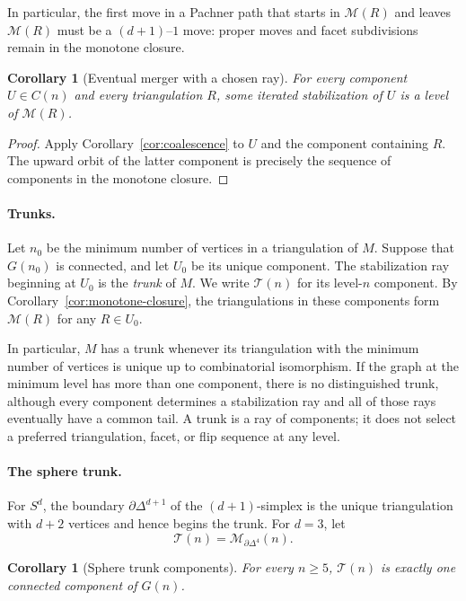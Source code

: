 \documentclass[11pt]{article}
\newtheorem{corollary}[theorem]{Corollary}
\theoremstyle{remark}
\theoremstyle{plain}
\begin{document}
In particular, the first move in a Pachner path that starts in
\(\mathcal M(R)\) and leaves \(\mathcal M(R)\) must be a
\((d+1)\)--\(1\) move: proper moves and facet subdivisions remain in the
monotone closure.

\begin{corollary}[Eventual merger with a chosen ray]
\label{cor:absorption}
For every component \(U\in C(n)\) and every triangulation \(R\), some
iterated stabilization of \(U\) is a level of \(\mathcal M(R)\).
\end{corollary}

\begin{proof}
Apply Corollary~\ref{cor:coalescence} to \(U\) and the component containing
\(R\).  The upward orbit of the latter component is precisely the sequence of
components in the monotone closure.
\end{proof}

\paragraph{Trunks.}
Let \(n_0\) be the minimum number of vertices in a triangulation of \(M\).
Suppose that \(G(n_0)\) is connected, and let \(U_0\) be its unique
component.  The stabilization ray beginning at \(U_0\) is the \emph{trunk}
of \(M\).  We write \(\mathcal T(n)\) for its level-\(n\) component.  By
Corollary~\ref{cor:monotone-closure}, the triangulations in these components
form \(\mathcal M(R)\) for any \(R\in U_0\).

In particular, \(M\) has a trunk whenever its triangulation with the minimum
number of vertices is unique up to combinatorial isomorphism.  If the graph
at the minimum level has more than one component, there is no distinguished
trunk, although every component determines a stabilization ray and all of
those rays eventually have a common tail.  A trunk is a ray of components; it
does not select a preferred triangulation, facet, or flip sequence at any
level.

\paragraph{The sphere trunk.}
For \(S^d\), the boundary \(\partial\Delta^{d+1}\) of the
\((d+1)\)-simplex is the unique triangulation with \(d+2\) vertices and hence
begins the trunk.  For \(d=3\), let
\[
 \mathcal T(n)=\mathcal M_{\partial\Delta^4}(n).
\]

\begin{corollary}[Sphere trunk components]
\label{cor:trunk-component}
For every \(n\ge5\), \(\mathcal T(n)\) is exactly one connected component
of \(G(n)\).
\end{corollary}
\end{document}
